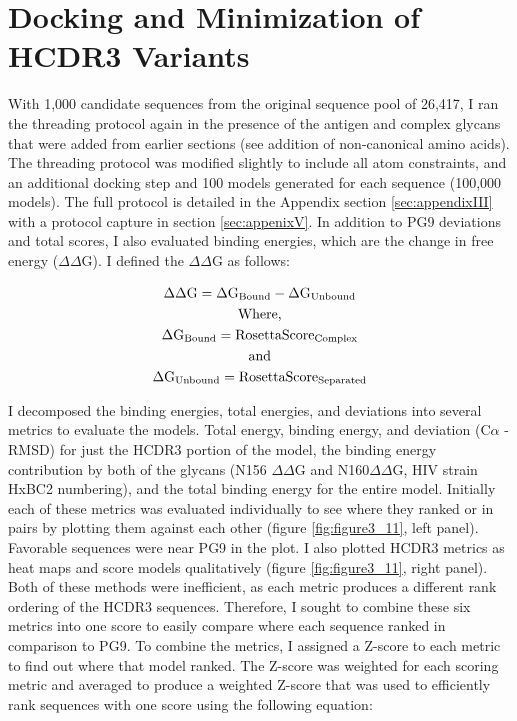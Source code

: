 \section{Docking and Minimization of HCDR3 Variants}
With 1,000 candidate sequences from the original sequence pool of 26,417, I ran the threading protocol again in the presence of the antigen and complex glycans that were added from earlier sections (see addition of non-canonical amino acids). The threading protocol was modified slightly to include all atom constraints, and an additional docking step and 100 models generated for each sequence (100,000 models). The full protocol is detailed in the Appendix section \ref{sec:appendixIII} with a protocol capture in section \ref{sec:appenixV}. In addition to PG9 deviations and total scores, I also evaluated binding energies, which are the change in free energy ($\Delta\Delta$G). I defined the $\Delta\Delta$G as follows:

\begin{gather*}
    \Delta \Delta \textup{G} = \Delta \textup{G}_{\textup{Bound}} - \Delta \textup{G}_{\textup{Unbound}} \\
    \textup{Where,} \\
    \Delta \textup{G}_{\textup{Bound}} = \textup{RosettaScore}_{\textup{Complex}} \\
    \textup{and}\\
    \Delta \textup{G}_{\textup{Unbound}} = \textup{RosettaScore}_{\textup{Separated}}
\end{gather*}

I decomposed the binding energies, total energies, and deviations into several metrics to evaluate the models. Total energy, binding energy, and deviation (C$\alpha$ - RMSD) for just the HCDR3 portion of the model, the binding energy contribution by both of the glycans (N156 $\Delta\Delta$G and N160$\Delta\Delta$G, HIV strain HxBC2 numbering), and the total binding energy for the entire model. Initially each of these metrics was evaluated individually to see where they ranked or in pairs by plotting them against each other (figure \ref{fig:figure3_11}, left panel). Favorable sequences were near PG9 in the plot. I also plotted HCDR3 metrics as heat maps and score models qualitatively (figure \ref{fig:figure3_11}, right panel). Both of these methods were inefficient, as each metric produces a different rank ordering of the HCDR3 sequences. Therefore, I sought to combine these six metrics into one score to easily compare where each sequence ranked in comparison to PG9. To combine the metrics, I assigned a Z-score to each metric to find out where that model ranked. The Z-score was weighted for each scoring metric and averaged to produce a weighted Z-score that was used to efficiently rank sequences with one score using the following equation:


